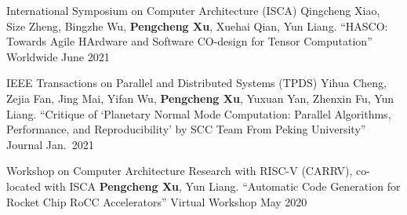 \begin{cventries}
  \cventry
    {International Symposium on Computer Architecture (ISCA)}
    {{\normalfont Qingcheng Xiao, Size Zheng, Bingzhe Wu, \textbf{Pengcheng Xu}, Xuehai Qian, Yun Liang. ``HASCO: Towards Agile HArdware and Software CO-design for Tensor Computation''}}
    {Worldwide} %
    {June 2021} %
    {}

  \cventry
    {IEEE Transactions on Parallel and Distributed Systems (TPDS)}
    {{\normalfont Yihua Cheng, Zejia Fan, Jing Mai, Yifan Wu, \textbf{Pengcheng Xu}, Yuxuan Yan, Zhenxin Fu, Yun Liang. ``Critique of `Planetary Normal Mode Computation: Parallel Algorithms, Performance, and Reproducibility' by SCC Team From Peking University''}}
    {Journal} %
    {Jan.\ 2021} %
    {}

  \cventry
    {Workshop on Computer Architecture Research with RISC-V (CARRV), co-located with ISCA} %
    {{\normalfont \textbf{Pengcheng Xu}, Yun Liang. ``Automatic Code Generation for Rocket Chip RoCC Accelerators''}} %
    {Virtual Workshop} %
    {May 2020} %
    {}
\end{cventries}
